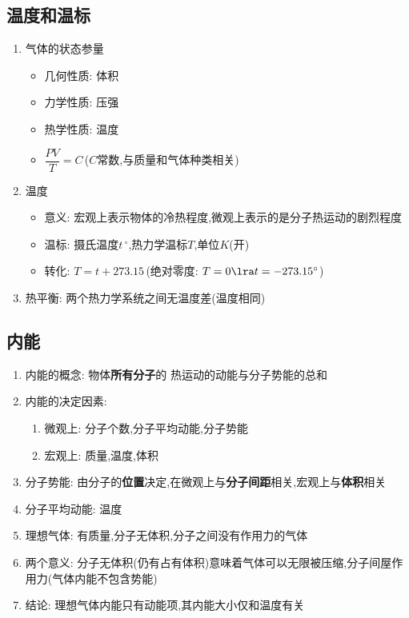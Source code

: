 \documentclass{article}
\begin{document}
\subsection{温度和温标}
\begin{enumerate}
    \item 气体的状态参量
          \begin{itemize}
              \item 几何性质: 体积
              \item 力学性质: 压强
              \item 热学性质: 温度
              \item $\dfrac{PV}{T} = C \,$($C$常数,与质量和气体种类相关)
          \end{itemize}
    \item 温度
          \begin{itemize}
              \item 意义: 宏观上表示物体的冷热程度,微观上表示的是分子热运动的剧烈程度
              \item 温标: 摄氏温度$t \, ^{\circ}$,热力学温标$T$,单位$K$(开)
              \item 转化: $T = t + 273.15 \,$(绝对零度: $T = 0 \lra t = -273.15^{\circ} $)
          \end{itemize}
    \item 热平衡: 两个热力学系统之间无温度差(温度相同)
\end{enumerate}

\vspace{2em}

\subsection{内能}
\begin{enumerate}
    \item 内能的概念: 物体\textbf{所有分子}的 热运动的动能与分子势能的总和
    \item 内能的决定因素:
          \begin{enumerate}[label = (\arabic*)]
              \item 微观上: 分子个数,分子平均动能,分子势能
              \item 宏观上: 质量,温度,体积
          \end{enumerate}
    \item 分子势能: 由分子的\textbf{位置}决定,在微观上与\textbf{分子间距}相关,宏观上与\textbf{体积}相关
    \item 分子平均动能: 温度
    \item 理想气体: 有质量,分子无体积,分子之间没有作用力的气体
    \item 两个意义: 分子无体积(仍有占有体积)意味着气体可以无限被压缩,分子间屋作用力(气体内能不包含势能)
    \item 结论: 理想气体内能只有动能项,其内能大小仅和温度有关
\end{enumerate}
\end{document}
